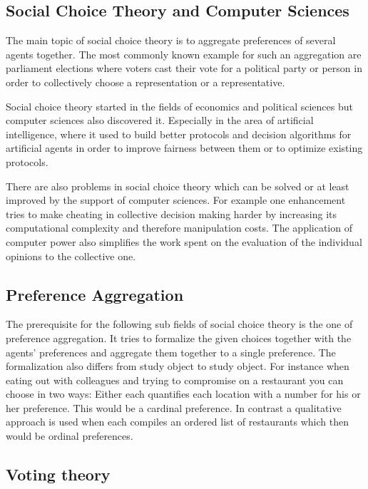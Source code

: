 \documentclass[a4paper]{paper}
\begin{document}
\subsection{Social Choice Theory and Computer Sciences}
The main topic of social choice theory is to aggregate preferences of several agents together. The most commonly known example for such an aggregation are parliament elections where voters cast their vote for a political party or person in order to collectively choose a representation or a representative.

Social choice theory started in the fields of economics and political sciences but computer sciences also discovered it. Especially in the area of artificial intelligence, where it used to build better protocols and decision algorithms for artificial agents in order to improve fairness between them or to optimize existing protocols. 

There are also problems in social choice theory which can be solved or at least improved by the support of computer sciences. For example one enhancement tries to make cheating in collective decision making harder by increasing its computational complexity and therefore manipulation costs. The application of computer power also simplifies the work spent on the evaluation of the individual opinions to the collective one.

\subsection{Preference Aggregation}

The prerequisite for the following sub fields of social choice theory is the one of preference aggregation. It tries to formalize the given choices together with the agents' preferences and aggregate them together to a single preference. The formalization also differs from study object to study object. For instance when eating out with colleagues and trying to compromise on a restaurant you can choose in two ways: Either each quantifies each location with a number for his or her preference. This would be a cardinal preference. In contrast a qualitative approach is used when each compiles an ordered list of restaurants which then would be ordinal preferences.~\cite[Chapter~2]{BCE12}

\subsection{Voting theory}
\end{document}
